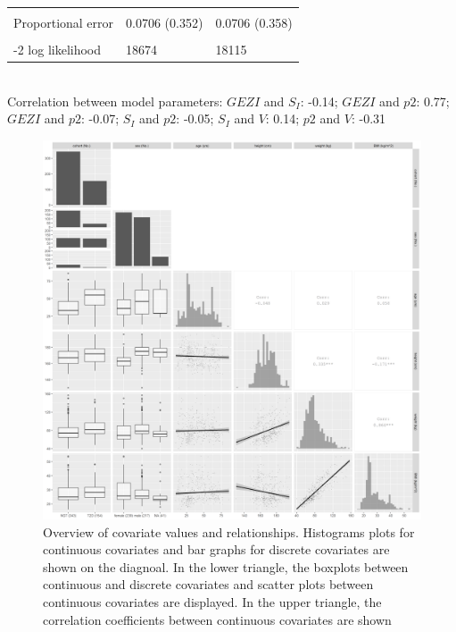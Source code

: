 \documentclass[utf8]{frontiersSCNS} %
\begin{document}
\begin{table}[h]
\begin{tabular}{lll}
                              &               &               \\
Proportional error  & 0.0706 (0.352)                            & 0.0706 (0.358) \\                        \\
-2 log likelihood             & 18674       & 18115       \\ \hline
\end{tabular}\\

Correlation between model parameters: $GEZI$ and $S_I$: -0.14; $GEZI$ and $p2$: 0.77; $GEZI$ and $p2$: -0.07; $S_I$ and $p2$: -0.05; $S_I$ and $V$: 0.14; $p2$ and $V$: -0.31
\end{table}

\begin{figure}[h!]
\begin{center}
\includegraphics[width=15cm]{p2.PNG}
\end{center}
\caption{Overview of covariate values and relationships. Histograms plots for continuous covariates and bar graphs for discrete covariates are shown on the diagnoal. In the lower triangle, the boxplots between continuous and discrete covariates and scatter plots between continuous covariates are displayed. In the upper triangle, the correlation coefficients between continuous covariates are shown}
\label{fig: cova}
\end{figure}
\end{document}

